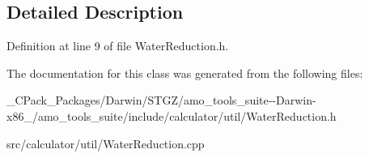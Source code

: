 \subsection{Detailed Description}


Definition at line 9 of file Water\+Reduction.\+h.



The documentation for this class was generated from the following files\+:\begin{DoxyCompactItemize}
\item 
\+\_\+\+C\+Pack\+\_\+\+Packages/\+Darwin/\+S\+T\+G\+Z/amo\+\_\+tools\+\_\+suite-\/-\/\+Darwin-\/x86\+\_/amo\+\_\+tools\+\_\+suite/include/calculator/util/Water\+Reduction.\+h\item 
src/calculator/util/Water\+Reduction.\+cpp\end{DoxyCompactItemize}

